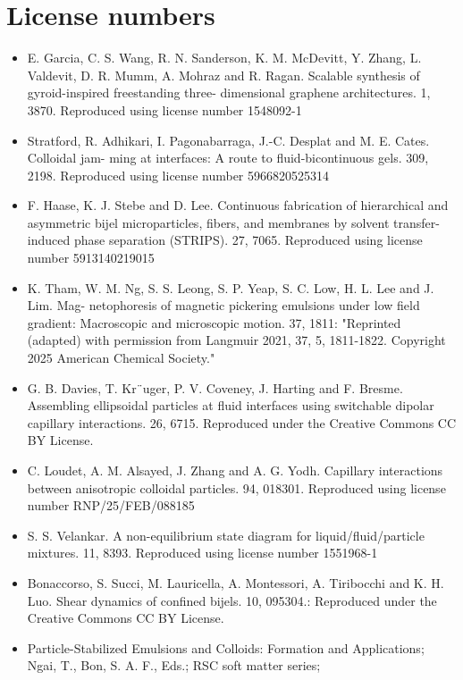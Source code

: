 \section{License numbers}

\begin{itemize}
    \item E. Garcia, C. S. Wang, R. N. Sanderson, K. M. McDevitt, Y. Zhang, L. Valdevit, D. R.
    Mumm, A. Mohraz and R. Ragan. Scalable synthesis of gyroid-inspired freestanding three-
    dimensional graphene architectures. 1, 3870. Reproduced using license number 1548092-1
    \item Stratford, R. Adhikari, I. Pagonabarraga, J.-C. Desplat and M. E. Cates. Colloidal jam-
    ming at interfaces: A route to fluid-bicontinuous gels. 309, 2198. Reproduced using license number 5966820525314
    \item F. Haase, K. J. Stebe and D. Lee. Continuous fabrication of hierarchical and asymmetric
    bijel microparticles, fibers, and membranes by solvent transfer-induced phase separation
    (STRIPS). 27, 7065. Reproduced using license number 5913140219015
    \item K. Tham, W. M. Ng, S. S. Leong, S. P. Yeap, S. C. Low, H. L. Lee and J. Lim. Mag-
    netophoresis of magnetic pickering emulsions under low field gradient: Macroscopic and
    microscopic motion. 37, 1811: "Reprinted (adapted) with permission from 
    Langmuir 2021, 37, 5, 1811-1822. Copyright 2025 American Chemical Society."
    \item G. B. Davies, T. Kr¨uger, P. V. Coveney, J. Harting and F. Bresme. Assembling ellipsoidal
    particles at fluid interfaces using switchable dipolar capillary interactions. 26, 6715. Reproduced under the Creative Commons CC BY License.
    \item C. Loudet, A. M. Alsayed, J. Zhang and A. G. Yodh. Capillary interactions between
    anisotropic colloidal particles. 94, 018301. Reproduced using license number RNP/25/FEB/088185
    \item S. S. Velankar. A non-equilibrium state diagram for liquid/fluid/particle mixtures. 11, 8393. Reproduced using license number 1551968-1
    \item Bonaccorso, S. Succi, M. Lauricella, A. Montessori, A. Tiribocchi and K. H. Luo. Shear
    dynamics of confined bijels. 10, 095304.: Reproduced under the Creative Commons CC BY License.
    \item Particle-Stabilized Emulsions and Colloids: Formation and Applications; Ngai, T., Bon, S. A. F., Eds.; RSC soft matter series; 

\end{itemize}
